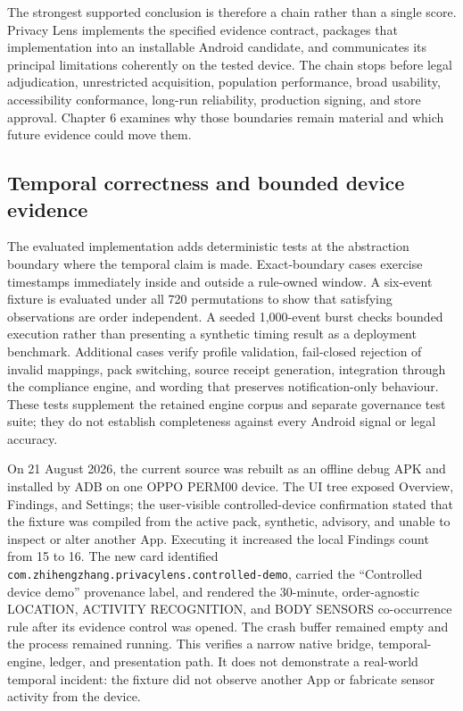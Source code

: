 The strongest supported conclusion is therefore a chain rather than a single score. Privacy Lens implements the specified evidence contract, packages that implementation into an installable Android candidate, and communicates its principal limitations coherently on the tested device. The chain stops before legal adjudication, unrestricted acquisition, population performance, broad usability, accessibility conformance, long-run reliability, production signing, and store approval. Chapter 6 examines why those boundaries remain material and which future evidence could move them.

\subsection{Temporal correctness and bounded device evidence}

The evaluated implementation adds deterministic tests at the abstraction boundary where the temporal claim is made. Exact-boundary cases exercise timestamps immediately inside and outside a rule-owned window. A six-event fixture is evaluated under all 720 permutations to show that satisfying observations are order independent. A seeded 1,000-event burst checks bounded execution rather than presenting a synthetic timing result as a deployment benchmark. Additional cases verify profile validation, fail-closed rejection of invalid mappings, pack switching, source receipt generation, integration through the compliance engine, and wording that preserves notification-only behaviour. These tests supplement the retained engine corpus and separate governance test suite; they do not establish completeness against every Android signal or legal accuracy.

On 21 August 2026, the current source was rebuilt as an offline debug APK and installed by ADB on one OPPO PERM00 device. The UI tree exposed Overview, Findings, and Settings; the user-visible controlled-device confirmation stated that the fixture was compiled from the active pack, synthetic, advisory, and unable to inspect or alter another App. Executing it increased the local Findings count from 15 to 16. The new card identified \texttt{com.zhihengzhang.privacylens.controlled-demo}, carried the ``Controlled device demo'' provenance label, and rendered the 30-minute, order-agnostic LOCATION, ACTIVITY RECOGNITION, and BODY SENSORS co-occurrence rule after its evidence control was opened. The crash buffer remained empty and the process remained running. This verifies a narrow native bridge, temporal-engine, ledger, and presentation path. It does not demonstrate a real-world temporal incident: the fixture did not observe another App or fabricate sensor activity from the device.

